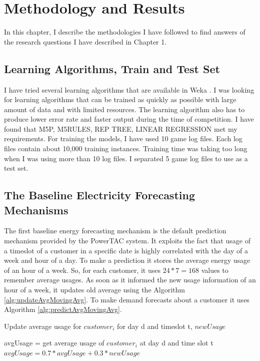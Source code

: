 
\chapter{Methodology and Results}

In this chapter, I describe the methodologies I have followed to find answers of the research questions I have described in Chapter 1.


\section{Learning Algorithms, Train and Test Set}
I have tried several learning algorithms that are available in Weka \cite{witten2005data}. I was looking for learning algorithms that can be trained as quickly as possible with large amount of data and with limited resources. The learning algorithm also has to produce lower error rate and faster output during the time of competition. I have found that M5P, M5RULES, REP TREE, LINEAR REGRESSION \cite{witten2005data} met my requirements. For training the models, I have used 10 game log files. Each log files contain about 10,000 training instances. Training time was taking too long when I was using more than 10 log files. I separated 5 game log files to use as a test set.

\section{The Baseline Electricity Forecasting Mechanisms}
The first baseline energy forecasting mechanism is the default prediction mechanism provided by the PowerTAC system. It exploits the fact that usage of a timeslot of a customer in a specific date is highly correlated with the day of a week and hour of a day. To make a prediction it stores the average energy usage of an hour of a week. So, for each customer, it uses $24*7 = 168$ values to remember average usages. As soon as it informed the new usage information of an hour of a week, it updates old average using the Algorithm \ref{alg:updateAvgMovingAvg}. To make demand forecasts about a customer it uses Algorithm \ref{alg:predictAvgMovingAvg}.

\begin{algorithm}
\caption{Update average usage for $customer_i$ for day d and timeslot t, $newUsage$}
\begin{algorithmic} [1]
\STATE avgUsage = get average usage of $customer_i$ at day d and time slot t
\STATE $avgUsage = 0.7 * avgUsage + 0.3 * newUsage$
\end{algorithmic}
\label{alg:updateAvgMovingAvg}
\end{algorithm}

